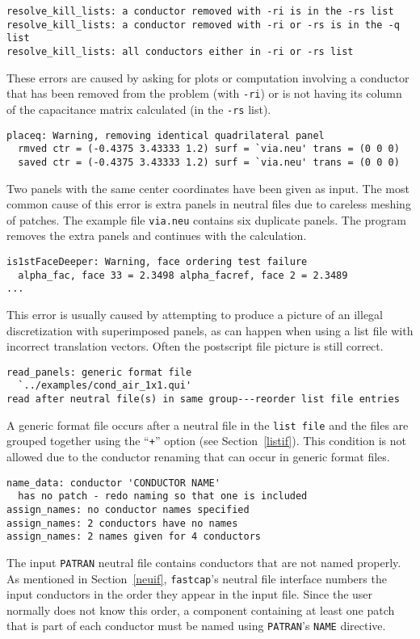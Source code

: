 \begin{verbatim}
resolve_kill_lists: a conductor removed with -ri is in the -rs list
resolve_kill_lists: a conductor removed with -ri or -rs is in the -q list
resolve_kill_lists: all conductors either in -ri or -rs list
\end{verbatim}\vspace{-\topsep}
These errors are caused by asking for plots or computation involving
a conductor that has
been removed from the problem (with {\tt -ri}) or is not having its
column of the capacitance matrix calculated (in the
{\tt -rs} list).

\begin{verbatim}
placeq: Warning, removing identical quadrilateral panel
  rmved ctr = (-0.4375 3.43333 1.2) surf = `via.neu' trans = (0 0 0)
  saved ctr = (-0.4375 3.43333 1.2) surf = `via.neu' trans = (0 0 0)
\end{verbatim}\vspace{-\topsep}
Two panels with the same center coordinates have been given as input.
The most common cause of this error is extra panels in neutral files
due to careless meshing of patches. The example file {\tt via.neu}
contains six duplicate panels. The program removes the extra panels
and continues with the calculation.

\begin{verbatim}
is1stFaceDeeper: Warning, face ordering test failure
  alpha_fac, face 33 = 2.3498 alpha_facref, face 2 = 2.3489
...
\end{verbatim}\vspace{-\topsep}
This error is usually caused by attempting 
to produce a picture of an illegal discretization with
superimposed panels, as can happen when using a list file with
incorrect translation vectors.  Often the postscript file picture
is still correct.

\begin{verbatim}
read_panels: generic format file
  `../examples/cond_air_1x1.qui'
read after neutral file(s) in same group---reorder list file entries
\end{verbatim}\vspace{-\topsep}
A generic format file occurs after a neutral file in the {\tt list file}
and the files are grouped together using the ``{\tt +}'' option
(see Section~\ref{listif}). This condition is not allowed due to
the conductor renaming that can occur in generic format files.

\begin{verbatim}
name_data: conductor 'CONDUCTOR NAME'
  has no patch - redo naming so that one is included
assign_names: no conductor names specified
assign_names: 2 conductors have no names
assign_names: 2 names given for 4 conductors
\end{verbatim}\vspace{-\topsep}
The input {\tt PATRAN} neutral file contains conductors that are not
named properly. As mentioned in Section~\ref{neuif}, {\tt fastcap}'s 
neutral file
interface numbers the input conductors in the order they appear in
the input file. Since the user normally does not know this order, 
a component containing at least one patch that is part of each conductor
must be named using {\tt PATRAN}'s {\tt NAME} directive.

